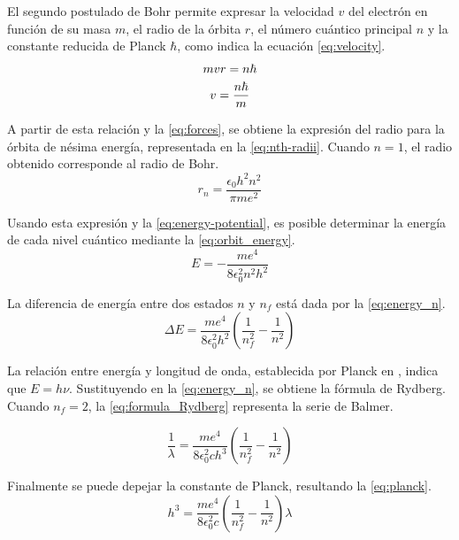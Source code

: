 El segundo postulado de Bohr permite expresar la velocidad \( v \) del electrón
en función de su masa \( m \), el radio de la órbita \( r \), el número cuántico
principal \( n \) y la constante reducida de Planck \( \hbar \), como indica la
ecuación \cref{eq:velocity}.
\begin{gather}
  m v r = n \hbar \notag \\
  v = \frac{n \hbar}{m} \label{eq:velocity}
\end{gather}

A partir de esta relación y la \cref{eq:forces}, se obtiene la expresión
del radio para la órbita de nésima energía, representada en la \cref{eq:nth-radii}.
Cuando \( n = 1 \), el radio obtenido corresponde al radio de Bohr.
\begin{equation}\label{eq:nth-radii}
  r_{n}=\frac{\epsilon_{0} h^{2} n^{2}}{\pi m e^{2}}
\end{equation}

Usando esta expresión y la \cref{eq:energy-potential}, es posible
determinar la energía de cada nivel cuántico mediante la \cref{eq:orbit_energy}.
\begin{equation}\label{eq:orbit_energy}
  E = -\frac{m e^4}{8\epsilon_0^2n^2h^2}
\end{equation}

La diferencia de energía entre dos estados \( n \) y \( n_f \) está dada por la
\cref{eq:energy_n}.
\begin{equation}\label{eq:energy_n}
  \Delta E=\frac{m e^4}{8\epsilon_0^2h^2}\left(\frac{1}{n_f^2}-\frac{1}{n^2}\right)
\end{equation}

La relación entre energía y longitud de onda, establecida por Planck en
\cite{planck1901}, indica que \( E= h \nu \).
Sustituyendo en la \cref{eq:energy_n}, se obtiene la fórmula de Rydberg.
Cuando \( n_f = 2 \), la \cref{eq:formula_Rydberg} representa la serie de Balmer.

\begin{equation}\label{eq:formula_Rydberg}
  \frac{1}{\lambda}= \frac{m e^4}{8 \epsilon_0^2 c h^3}\left(\frac{1}{n_f^2}-\frac{1}{n^2}\right)
\end{equation}

Finalmente se puede depejar la constante de Planck, resultando la \cref{eq:planck}.
\begin{equation}\label{eq:planck}
  h^3 = \frac{m e^4}{8 \epsilon_0^2 c}\left(\frac{1}{n_f^2}-\frac{1}{n^2}\right) \lambda
\end{equation}
